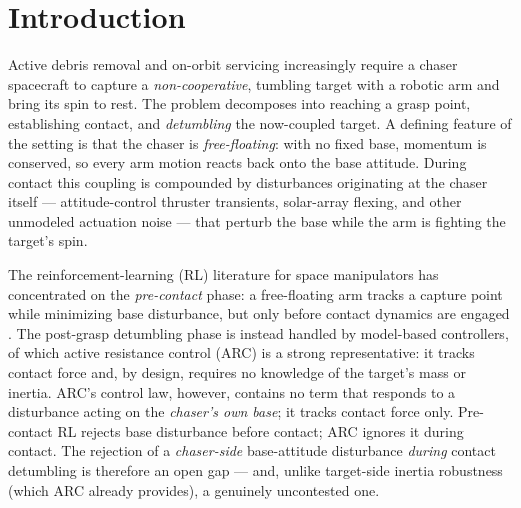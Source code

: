 \documentclass[conference]{IEEEtran}
\begin{document}
\section{Introduction}
Active debris removal and on-orbit servicing increasingly require a chaser spacecraft to capture a
\emph{non-cooperative}, tumbling target with a robotic arm and bring its spin to rest. The problem
decomposes into reaching a grasp point, establishing contact, and \emph{detumbling} the now-coupled
target. A defining feature of the setting is that the chaser is \emph{free-floating}: with no fixed
base, momentum is conserved, so every arm motion reacts back onto the base attitude. During contact
this coupling is compounded by disturbances originating at the chaser itself --- attitude-control
thruster transients, solar-array flexing, and other unmodeled actuation noise --- that perturb the
base while the arm is fighting the target's spin.

The reinforcement-learning (RL) literature for space manipulators has concentrated on the
\emph{pre-contact} phase: a free-floating arm tracks a capture point while minimizing base
disturbance, but only before contact dynamics are engaged \cite{guidance2510,wei2025robotica}. The
post-grasp detumbling phase is instead handled by model-based controllers, of which active
resistance control (ARC) \cite{activeresist2025} is a strong representative: it tracks contact force
and, by design, requires no knowledge of the target's mass or inertia. ARC's control law, however,
contains no term that responds to a disturbance acting on the \emph{chaser's own base}; it tracks
contact force only. Pre-contact RL rejects base disturbance before contact; ARC ignores it during
contact. The rejection of a \emph{chaser-side} base-attitude disturbance \emph{during} contact
detumbling is therefore an open gap --- and, unlike target-side inertia robustness (which ARC
already provides), a genuinely uncontested one.
\end{document}
